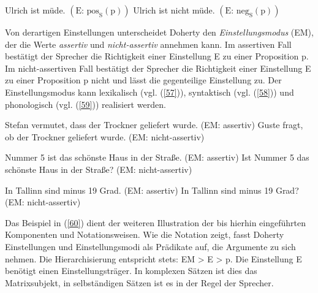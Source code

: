 \begin{exe}
	\ex\label{56} 
		\begin{xlist}	
			\ex\label{56a} Ulrich ist müde. $(\textrm{E: pos}_{\textrm{S}}(\textrm{p}))$
			\ex\label{56b} Ulrich ist nicht müde. $(\textrm{E: neg}_{\textrm{S}}(\textrm{p}))$
		\end{xlist}
\end{exe}
Von derartigen Einstellungen unterscheidet Doherty den \textit{Einstellungsmodus}  (EM), der die Werte \textit{assertiv} und \textit{nicht-assertiv} annehmen kann. Im assertiven Fall bestätigt der Sprecher die Richtigkeit einer Einstellung E zu einer Proposition p. Im nicht-assertiven Fall bestätigt der Sprecher die Richtigkeit einer Einstellung E zu einer Proposition p nicht und lässt die gegenteilige Einstellung zu. Der Einstellungsmodus kann lexikalisch (vgl. (\ref{57})), syntaktisch (vgl. (\ref{58})) und phonologisch (vgl. (\ref{59})) realisiert werden.

\begin{exe}
	\ex\label{57} 
		\begin{xlist}	
			\ex\label{57a} Stefan vermutet, dass der Trockner geliefert wurde. (EM: assertiv)
			\ex\label{57b} Guste fragt, ob der Trockner geliefert wurde. (EM: nicht-assertiv)
		\end{xlist}
\end{exe}

\begin{exe}
	\ex\label{58} 
		\begin{xlist}	
			\ex\label{58a} Nummer 5 ist das schönste Haus in der Straße. (EM: assertiv)
			\ex\label{58b} Ist Nummer 5 das schönste Haus in der Straße? (EM: nicht-assertiv)
		\end{xlist}
\end{exe}	 
			
\begin{exe}
	\ex\label{59} 
		\begin{xlist}	
			\ex\label{59a} In Tallinn sind minus 19 Grad. (EM: assertiv)
			\ex\label{59b} In Tallinn sind minus 19 Grad? (EM: nicht-assertiv)	
		\end{xlist}
\end{exe}
Das Beispiel in (\ref{60}) dient der weiteren Illustration der bis hierhin eingeführten Komponenten und Notationsweisen. Wie die Notation zeigt, fasst Doherty Einstellungen und Einstellungsmodi als Prädikate auf, die Argumente zu sich nehmen. Die Hierarchisierung entspricht stets: EM > E > p. Die Einstellung E benötigt einen Einstellungsträger. In komplexen Sätzen ist dies das Matrixsubjekt, in selbständigen Sätzen ist es in der Regel der Sprecher. 

